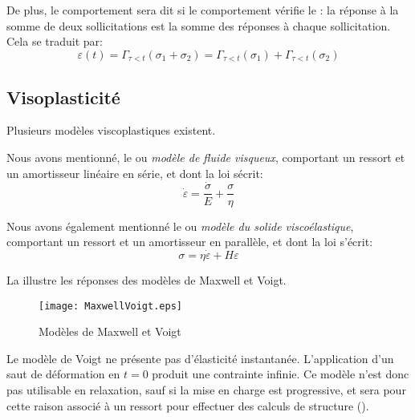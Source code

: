 \medskip
De plus, le comportement sera dit  si le comportement vérifie
le : 
la réponse à la somme de deux sollicitations
est la somme des réponses à chaque sollicitation. Cela se traduit par:
\begin{equation} \varepsilon(t) = \Gamma_{\tau<t}(\sigma_1+\sigma_2) = \Gamma_{\tau<t}(\sigma_1)
+\Gamma_{\tau<t}(\sigma_2) \end{equation}



\medskip
\subsection{Visoplasticité}

Plusieurs modèles viscoplastiques existent.

Nous avons mentionné, le  
ou \emph{modèle de fluide visqueux}, comportant un ressort et un amortisseur linéaire en série, et 
dont la loi sécrit:
\begin{equation} \dot{\varepsilon}=\frac{\dot{\sigma}}E+\frac{\sigma}{\eta} \end{equation}

Nous avons également mentionné le  
ou \emph{modèle du solide viscoélastique}, comportant un ressort et un amortisseur en parallèle, 
et dont la loi s'écrit:
\begin{equation} \sigma=\eta\dot{\varepsilon}+H\varepsilon \end{equation}

La  illustre les réponses des modèles de Maxwell et Voigt.
\begin{figure}[htb]
\centerline{\texttt{[image: MaxwellVoigt.eps]}}
\caption{Modèles de Maxwell et Voigt}\label{Fig-MaxwellVoigt}
\end{figure}


\medskip
Le modèle de Voigt ne présente pas d'élasticité instantanée.
L'application d'un saut de déformation en $t = 0$ produit une contrainte infinie. 
Ce modèle n'est donc pas utilisable en relaxation, sauf si la mise en charge est progressive, et sera pour 
cette raison associé à un ressort pour effectuer des calculs de structure ().

